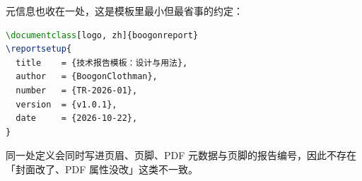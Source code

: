 元信息也收在一处，这是模板里最小但最省事的约定：

\begin{lstlisting}[language=TeX,
  caption={\texttt{\textbackslash reportsetup} 的典型写法。所有键都可省略，省略时用默认值。},
  label={lst:setup}]
\documentclass[logo, zh]{boogonreport}
\reportsetup{
  title    = {技术报告模板：设计与用法},
  author   = {BoogonClothman},
  number   = {TR-2026-01},
  version  = {v1.0.1},
  date     = {2026-10-22},
}
\end{lstlisting}

同一处定义会同时写进页眉、页脚、PDF 元数据与页脚的报告编号，因此不存在
「封面改了、PDF 属性没改」这类不一致。
